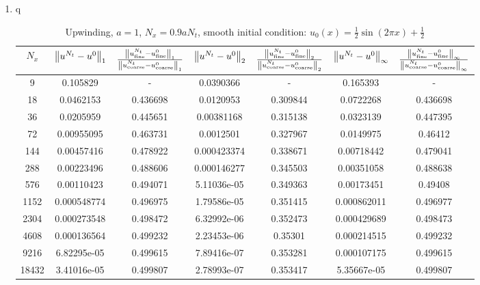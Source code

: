 \documentclass{article} %
\theoremstyle{plain}
\numberwithin{equation}{section} %
\numberwithin{figure}{section} %
\numberwithin{table}{section} %
\begin{document}
\begin{enumerate}[\ \ (a)]
    \item {\color{white}q}
        \begin{table}[ht!]
            \caption*{Upwinding, $a = 1$, $N_x = 0.9aN_t$, smooth initial condition: $u_0(x) = \frac{1}{2}\sin(2\pi x) + \frac{1}{2}$}
            \centering
            \begin{tabular}{||c|c|c||c|c||c|c||}\hline\hline
               $N_x$ & $\norm{u^{N_t} - u^0}_1$ & $\frac{\norm{u_\text{fine}^{N_t} - u_\text{fine}^0}_1}{\norm{u_\text{coarse}^{N_t} - u_\text{coarse}^0}_1}$ & $\norm{u^{N_t} - u^0}_2$ & $\frac{\norm{u_\text{fine}^{N_t} - u_\text{fine}^0}_2}{\norm{u_\text{coarse}^{N_t} - u_\text{coarse}^0}_2}$ & $\norm{u^{N_t} - u^0}_\infty$ & $\frac{\norm{u_\text{fine}^{N_t} - u_\text{fine}^0}_\infty}{\norm{u_\text{coarse}^{N_t} - u_\text{coarse}^0}_\infty}$ \\
            \hline
                 9 & 0.105829    & -        & 0.0390366   & -        & 0.165393    & -        \\
                18 & 0.0462153   & 0.436698 & 0.0120953   & 0.309844 & 0.0722268   & 0.436698 \\
                36 & 0.0205959   & 0.445651 & 0.00381168  & 0.315138 & 0.0323139   & 0.447395 \\
                72 & 0.00955095  & 0.463731 & 0.0012501   & 0.327967 & 0.0149975   & 0.46412  \\
               144 & 0.00457416  & 0.478922 & 0.000423374 & 0.338671 & 0.00718442  & 0.479041 \\
               288 & 0.00223496  & 0.488606 & 0.000146277 & 0.345503 & 0.00351058  & 0.488638 \\
               576 & 0.00110423  & 0.494071 & 5.11036e-05 & 0.349363 & 0.00173451  & 0.49408  \\
              1152 & 0.000548774 & 0.496975 & 1.79586e-05 & 0.351415 & 0.000862011 & 0.496977 \\
              2304 & 0.000273548 & 0.498472 & 6.32992e-06 & 0.352473 & 0.000429689 & 0.498473 \\
              4608 & 0.000136564 & 0.499232 & 2.23453e-06 & 0.35301  & 0.000214515 & 0.499232 \\
              9216 & 6.82295e-05 & 0.499615 & 7.89416e-07 & 0.353281 & 0.000107175 & 0.499615 \\
             18432 & 3.41016e-05 & 0.499807 & 2.78993e-07 & 0.353417 & 5.35667e-05 & 0.499807 \\

\end{tabular}
\end{table}
\end{enumerate}
\end{document}
